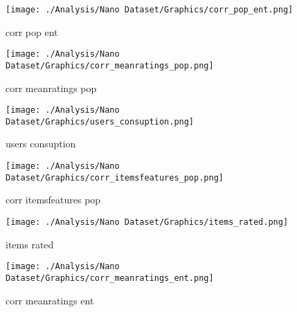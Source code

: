 \documentclass{article}
\begin{document}
	\begin{figure}[!ht]
	    \centering
		\begin{minipage}{0.5\textwidth}
		    \centering
		    \texttt{[image: ./Analysis/Nano Dataset/Graphics/corr\_pop\_ent.png]} 
		    \caption{corr pop ent}
		    \label{fig:figura1minipg}
		\end{minipage}\hfill
	    \begin{minipage}{0.5\textwidth}
		    \centering
		    \texttt{[image: ./Analysis/Nano Dataset/Graphics/corr\_meanratings\_pop.png]} 
		    \caption{corr meanratings pop}
		    \label{fig:figura1minipg}
		\end{minipage}\hfill
	    \begin{minipage}{0.5\textwidth}
		    \centering
		    \texttt{[image: ./Analysis/Nano Dataset/Graphics/users\_consuption.png]} 
		    \caption{users consuption}
		    \label{fig:figura1minipg}
		\end{minipage}\hfill
	    \begin{minipage}{0.5\textwidth}
		    \centering
		    \texttt{[image: ./Analysis/Nano Dataset/Graphics/corr\_itemsfeatures\_pop.png]} 
		    \caption{corr itemsfeatures pop}
		    \label{fig:figura1minipg}
		\end{minipage}\hfill
	    \begin{minipage}{0.5\textwidth}
		    \centering
		    \texttt{[image: ./Analysis/Nano Dataset/Graphics/items\_rated.png]} 
		    \caption{items rated}
		    \label{fig:figura1minipg}
		\end{minipage}\hfill
	    \begin{minipage}{0.5\textwidth}
		    \centering
		    \texttt{[image: ./Analysis/Nano Dataset/Graphics/corr\_meanratings\_ent.png]} 
		    \caption{corr meanratings ent}
		    \label{fig:figura1minipg}
		\end{minipage}\hfill
	    
		\label{fig:figurasminipg}
	\end{figure}
			
\end{document}
